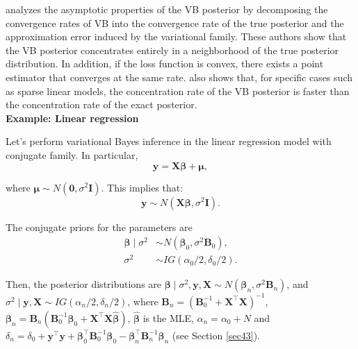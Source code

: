 
\cite{zhang2020convergence} analyzes the asymptotic properties of the VB posterior by decomposing the convergence rates of VB into the convergence rate of the true posterior and the approximation error induced by the variational family. These authors show that the VB posterior concentrates entirely in a neighborhood of the true posterior distribution. In addition, if the loss function is convex, there exists a point estimator that converges at the same rate. \cite{zhang2020convergence} also shows that, for specific cases such as sparse linear models, the concentration rate of the VB posterior is faster than the concentration rate of the exact posterior.\\

\textbf{Example: Linear regression}

Let's perform variational Bayes inference in the linear regression model with conjugate family. In particular, 
\[
\boldsymbol{y} = \boldsymbol{X} \boldsymbol{\beta} + \boldsymbol{\mu},
\]

where \( \boldsymbol{\mu} \sim N(\boldsymbol{0}, \sigma^2 \boldsymbol{I}) \). This implies that:
\[
\boldsymbol{y} \sim N(\boldsymbol{X} \boldsymbol{\beta}, \sigma^2 \boldsymbol{I}).\] 

The conjugate priors for the parameters are
\begin{align*}
	\boldsymbol{\beta}\mid \sigma^2 & \sim N(\boldsymbol{\beta}_0, \sigma^2 {\boldsymbol{B}}_0),\\
	\sigma^2 & \sim IG(\alpha_0/2, \delta_0/2).
\end{align*}

Then, the posterior distributions are $\boldsymbol{\beta}\mid \sigma^2, \boldsymbol{y}, \boldsymbol{X} \sim N(\boldsymbol{\beta}_n, \sigma^2\boldsymbol{B}_n)$, and 	$\sigma^2\mid  \boldsymbol{y}, \boldsymbol{X}\sim IG(\alpha_n/2, \delta_n/2)$, where $\boldsymbol{B}_n = (\boldsymbol{B}_0^{-1} + \boldsymbol{X}^{\top}\boldsymbol{X})^{-1}$, $\boldsymbol{\beta}_n = \boldsymbol{B}_n(\boldsymbol{B}_0^{-1}\boldsymbol{\beta}_0 + \boldsymbol{X}^{\top}\boldsymbol{X}\hat{\boldsymbol{\beta}})$, $\hat{\boldsymbol{\beta}}$ is the MLE, $\alpha_n = \alpha_0 + N$ and $\delta_n = \delta_0 + \boldsymbol{y}^{\top}\boldsymbol{y} + \boldsymbol{\beta}_0^{\top}\boldsymbol{B}_0^{-1}\boldsymbol{\beta}_0 - \boldsymbol{\beta}_n^{\top}\boldsymbol{B}_n^{-1}\boldsymbol{\beta}_n$ (see Section \ref{sec43}).

